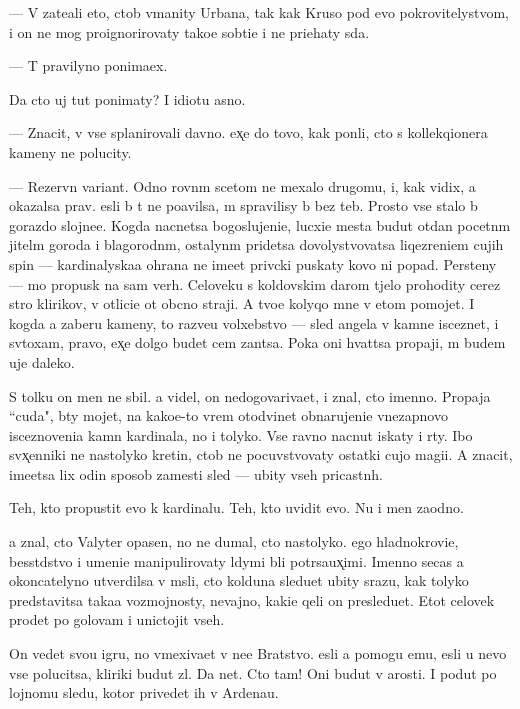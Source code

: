\documentclass[10pt]{book}
\begin{document}
— V{\yi} zate{\y}ali eto, ctob{\yi} v{\yi}manity Urbana, tak kak Kruso pod {\y}evo pokrovitelystvom, i on ne mog pro{\y}ignorirovaty tako{\y}e sob{\yi}ti{\y}e i ne pri{\y}ehaty s{\iu}da.

— T{\yi} pravilyno ponima{\y}ex.

Da cto uj tut ponimaty? I idiotu {\y}asno.

— Znacit, v{\yi} vse splanirovali davno. {\Y}ex̨e do tovo, kak pon{\ia}li, cto s kollekqionera kameny ne polucity.

— Rezervn{\yi}{\y} variant. Odno rovn{\yi}m scetom ne mexalo drugomu, i, kak vidix, {\y}a okazalsa prav. {\Y}esli b{\yi} t{\yi} ne po{\y}avilsa, m{\yi} spravilisy b{\yi} bez teb{\ia}. Prosto vse stalo b{\yi} gorazdo slojne{\y}e. Kogda nacnetsa bogoslujeni{\y}e, lucxi{\y}e mesta budut otdan{\yi} pocetn{\yi}m jitel{\ia}m goroda i blagorodn{\yi}m, ostalyn{\yi}m pridetsa dovolystvovatsa liqezreni{\y}em cujih spin — kardinalyska{\y}a ohrana ne ime{\y}et priv{\yi}cki puskaty kovo ni popad{\ia}. Persteny — mo{\y} propusk na sam{\yi}{\y} verh. Celoveku s koldovskim darom t{\ia}jelo prohodity cerez stro{\y} klirikov, v otlici{\y}e ot ob{\yi}cno{\y} straji. A tvo{\y}e kolyqo mne v etom pomojet. I kogda {\y}a zaberu kameny, to razve{\y}u volxebstvo — sled angela v kamne isceznet, i sv{\ia}toxam, pravo, {\y}ex̨e dolgo budet cem zan{\ia}tsa. Poka oni hvat{\ia}tsa propaji, m{\yi} budem uje daleko.

S tolku on men{\ia} ne sbil. {\Y}a videl, on nedogovariva{\y}et, i znal, cto imenno. Propaja ``cuda", b{\yi}ty mojet, na kako{\y}e-to vrem{\ia} otodvinet obnarujeni{\y}e vnezapnovo isceznoveni{\y}a kamn{\ia} kardinala, no i tolyko. Vse ravno nacnut iskaty i r{\yi}ty. Ibo sv{\ia}x̨enniki ne nastolyko kretin{\yi}, ctob{\yi} ne pocuvstvovaty ostatki cujo{\y} magi{\y}i. A znacit, ime{\y}etsa lix odin sposob zamesti sled{\yi} — ubity vseh pricastn{\yi}h.

Teh, kto propustit {\y}evo k kardinalu. Teh, kto uvidit {\y}evo. Nu i men{\ia} zaodno.

{\Y}a znal, cto Valyter opasen, no ne dumal, cto nastolyko. {\Y}ego hladnokrovi{\y}e, besst{\yi}dstvo i umeni{\y}e manipulirovaty l{\iu}dymi b{\yi}li potr{\ia}sa{\y}ux̨imi. Imenno se{\y}cas {\y}a okoncatelyno utverdilsa v m{\yi}sli, cto kolduna sledu{\y}et ubity srazu, kak tolyko predstavitsa taka{\y}a vozmojnosty, nevajno, kaki{\y}e qeli on presledu{\y}et. Etot celovek pro{\y}det po golovam i unictojit vseh.

On vedet svo{\y}u igru, no vmexiva{\y}et v ne{\y}e Bratstvo. {\Y}esli {\y}a pomogu {\y}emu, {\y}esli u nevo vse polucitsa, kliriki budut zl{\yi}. Da net. Cto tam! Oni budut v {\y}arosti. I po{\y}dut po lojnomu sledu, kotor{\yi}{\y} privedet ih v Ardenau.
\end{document}
